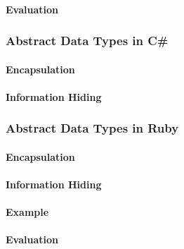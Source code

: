 \paragraph{Evaluation}\label{par:Java_Abstract_Data_Type_Evaluation}

\subsubsection{Abstract Data Types in C\#}\label{subsubsec:Abstract_Data_Types_CSharp}
\paragraph{Encapsulation}\label{par:Objective_C_Encapsulation}
\paragraph{Information Hiding}\label{par:Objective_C_Info_Hiding}

\subsubsection{Abstract Data Types in Ruby}\label{subsubsec:Abstract_Data_Types_Ruby}
\paragraph{Encapsulation}\label{par:Ruby_Encapsulation}
\paragraph{Information Hiding}\label{par:Ruby_Info_Hiding}
\paragraph{Example}\label{par:Ruby_Abstract_Data_Type_Example}
\paragraph{Evaluation}\label{par:Ruby_Abstract_Data_Type_Evaluation}
